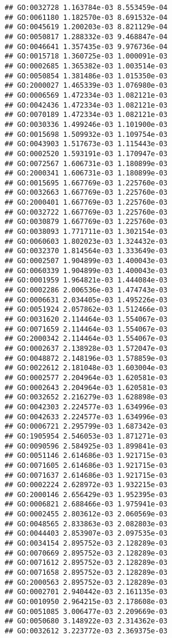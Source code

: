 \documentclass[
]{article}
\begin{document}
\begin{verbatim}
## GO:0032728 1.163784e-03 8.553459e-04
## GO:0061180 1.182570e-03 8.691532e-04
## GO:0045619 1.200203e-03 8.821129e-04
## GO:0050817 1.288332e-03 9.468847e-04
## GO:0046641 1.357435e-03 9.976736e-04
## GO:0015718 1.360725e-03 1.000091e-03
## GO:0002685 1.365382e-03 1.003514e-03
## GO:0050854 1.381486e-03 1.015350e-03
## GO:2000027 1.465339e-03 1.076980e-03
## GO:0006569 1.472334e-03 1.082121e-03
## GO:0042436 1.472334e-03 1.082121e-03
## GO:0070189 1.472334e-03 1.082121e-03
## GO:0030336 1.499246e-03 1.101900e-03
## GO:0015698 1.509932e-03 1.109754e-03
## GO:0043903 1.517673e-03 1.115443e-03
## GO:0002520 1.593191e-03 1.170947e-03
## GO:0072567 1.606731e-03 1.180899e-03
## GO:2000341 1.606731e-03 1.180899e-03
## GO:0015695 1.667769e-03 1.225760e-03
## GO:0032663 1.667769e-03 1.225760e-03
## GO:2000401 1.667769e-03 1.225760e-03
## GO:0032722 1.667769e-03 1.225760e-03
## GO:0030879 1.667769e-03 1.225760e-03
## GO:0038093 1.771711e-03 1.302154e-03
## GO:0060603 1.802023e-03 1.324432e-03
## GO:0032370 1.814564e-03 1.333649e-03
## GO:0002507 1.904899e-03 1.400043e-03
## GO:0060339 1.904899e-03 1.400043e-03
## GO:0001959 1.964821e-03 1.444084e-03
## GO:0002286 2.006536e-03 1.474743e-03
## GO:0006631 2.034405e-03 1.495226e-03
## GO:0051924 2.057862e-03 1.512466e-03
## GO:0031620 2.114464e-03 1.554067e-03
## GO:0071659 2.114464e-03 1.554067e-03
## GO:2000342 2.114464e-03 1.554067e-03
## GO:0002637 2.138928e-03 1.572047e-03
## GO:0048872 2.148196e-03 1.578859e-03
## GO:0022612 2.181048e-03 1.603004e-03
## GO:0002577 2.204964e-03 1.620581e-03
## GO:0002643 2.204964e-03 1.620581e-03
## GO:0032652 2.216279e-03 1.628898e-03
## GO:0042303 2.224577e-03 1.634996e-03
## GO:0042633 2.224577e-03 1.634996e-03
## GO:0006721 2.295799e-03 1.687342e-03
## GO:1905954 2.546053e-03 1.871271e-03
## GO:0090596 2.584925e-03 1.899841e-03
## GO:0051146 2.614686e-03 1.921715e-03
## GO:0071605 2.614686e-03 1.921715e-03
## GO:0071637 2.614686e-03 1.921715e-03
## GO:0002224 2.628972e-03 1.932215e-03
## GO:2000146 2.656429e-03 1.952395e-03
## GO:0006821 2.688466e-03 1.975941e-03
## GO:0002455 2.803612e-03 2.060569e-03
## GO:0048565 2.833863e-03 2.082803e-03
## GO:0044403 2.853907e-03 2.097535e-03
## GO:0034154 2.895752e-03 2.128289e-03
## GO:0070669 2.895752e-03 2.128289e-03
## GO:0071612 2.895752e-03 2.128289e-03
## GO:0071658 2.895752e-03 2.128289e-03
## GO:2000563 2.895752e-03 2.128289e-03
## GO:0002701 2.940442e-03 2.161135e-03
## GO:0010950 2.964215e-03 2.178608e-03
## GO:0051085 3.006477e-03 2.209669e-03
## GO:0050680 3.148922e-03 2.314362e-03
## GO:0032612 3.223772e-03 2.369375e-03

\end{verbatim}
\end{document}
